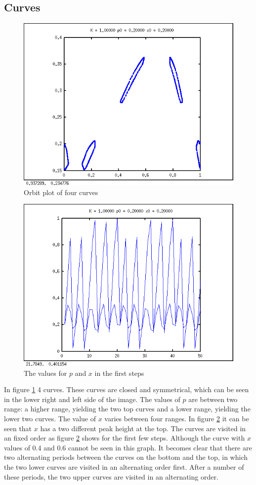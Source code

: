 \documentclass{article}
\begin{document}
\subsection*{Curves}
\begin{figure}[H]
\centering
\includegraphics[width=.8\textwidth]{curvesorbit.png}
\caption{Orbit plot of four curves}
\label{curveorbit}
\end{figure}
\begin{figure}[H]
\centering
\includegraphics[width=.8\textwidth]{curvesvalues.png}
\caption{The values for $p$ and $x$ in the first steps }
\label{curveval}
\end{figure}

\newpage

In figure \ref{curveorbit} 4 curves. These curves are closed and symmetrical, which can be seen in the lower right and left side of the image.  The values of $p$ are between two range: a higher range, yielding the two top curves and a lower range, yielding the lower two curves. The value of $x$ varies between four ranges. In figure \ref{curveval} it can be seen that $x$ has a two different peak height at the top. The curves are visited in an fixed order as figure \ref{curveval} shows for the first few steps. Although the curve with $x$ values of 0.4 and 0.6 cannot be seen in this graph. It becomes clear that there are two alternating periods between the curves on the bottom and the top, in which the two lower curves are visited in an alternating order first. After a number of these periods, the two upper curves are visited in an alternating order.
\end{document}
